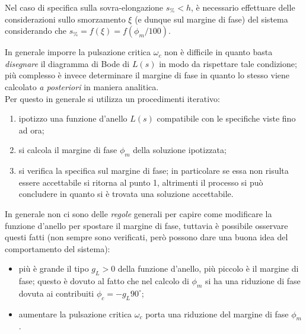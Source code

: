 		Nel caso di specifica sulla sovra-elongazione $s_\% < h$, è necessario effettuare delle considerazioni sullo smorzamento $\xi$ (e dunque sul margine di fase) del sistema considerando che $s_\% = f(\xi) = f(\phi_m/100)$.
		
		In generale imporre la pulsazione critica $\omega_c$ non è difficile in quanto basta \textit{disegnare} il diagramma di Bode di $L(s)$ in modo da rispettare tale condizione; più complesso è invece determinare il margine di fase in quanto lo stesso viene calcolato \textit{a posteriori} in maniera analitica. \\
		Per questo in generale si utilizza un procedimenti iterativo:
		\begin{enumerate}
			\item ipotizzo una funzione d'anello $L(s)$ compatibile con le specifiche viste fino ad ora;
			\item si calcola il margine di fase $\phi_m$ della soluzione ipotizzata;
			\item si verifica la specifica sul margine di fase; in particolare se essa non risulta essere accettabile si ritorna al punto 1, altrimenti il processo si può concludere in quanto si è trovata una soluzione accettabile.
		\end{enumerate}

		In generale non ci sono delle \textit{regole} generali per capire come modificare la funzione d'anello per spostare il margine di fase, tuttavia è possibile osservare questi fatti (non sempre sono verificati, però possono dare una buona idea del comportamento del sistema):
		\begin{itemize}
			\item più è grande il tipo $g_L > 0$ della funzione d'anello, più piccolo è il margine di fase; questo è dovuto al fatto che nel calcolo di $\phi_m$ si ha una riduzione di fase dovuta ai contribuiti $\phi_c = - g_L 90^\circ$;
			\item aumentare la pulsazione critica $\omega_c$ porta una riduzione del margine di fase $\phi_m$.
		\end{itemize}

